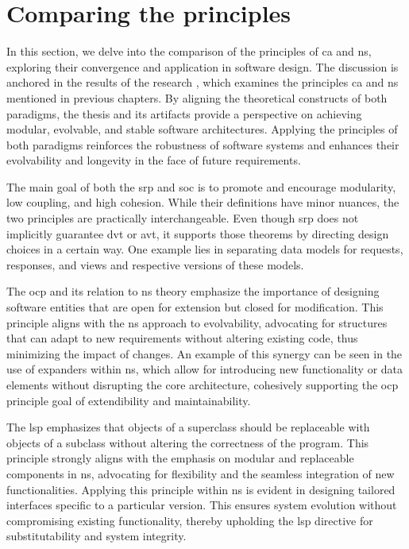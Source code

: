 \section{Comparing the principles} \label{subsec:converging_principles}

In this section, we delve into the comparison of the principles of \gls{ca} and \gls{ns},
exploring their convergence and application in software design. The discussion is anchored
in the results of the research  
\cite{koks_convergence_2023}, which examines the principles \gls{ca} and \gls{ns}
mentioned in previous chapters. By aligning the theoretical constructs of both paradigms,
the thesis and its artifacts provide a perspective on achieving modular, evolvable, and
stable software architectures. Applying the principles of both paradigms reinforces the
robustness of software systems and enhances their evolvability and longevity in the face
of future requirements.

The main goal of both the \gls{srp} and \gls{soc} is to promote and encourage modularity,
low coupling, and high cohesion. While their definitions have minor nuances, the two
principles are practically interchangeable. Even though \gls{srp} does not implicitly
guarantee \gls{dvt} or \gls{avt}, it supports those theorems by directing design choices
in a certain way. One example lies in separating data models for requests, responses, and
views and respective versions of these models.

The \gls{ocp} and its relation to \gls{ns} theory emphasize the importance of designing
software entities that are open for extension but closed for modification. This principle
aligns with the \gls{ns} approach to evolvability, advocating for structures that can
adapt to new requirements without altering existing code, thus minimizing the impact of
changes. An example of this synergy can be seen in the use of expanders within \gls{ns},
which allow for introducing new functionality or data elements without disrupting the core
architecture, cohesively supporting the \gls{ocp} principle goal of extendibility and
maintainability.

The \gls{lsp} emphasizes that objects of a superclass should be replaceable with objects
of a subclass without altering the correctness of the program. This principle strongly
aligns with the emphasis on modular and replaceable components in \gls{ns}, advocating for
flexibility and the seamless integration of new functionalities. Applying this principle
within \gls{ns} is evident in designing tailored interfaces specific to a particular
version. This ensures system evolution without compromising existing functionality,
thereby upholding the \gls{lsp} directive for substitutability and system integrity.


